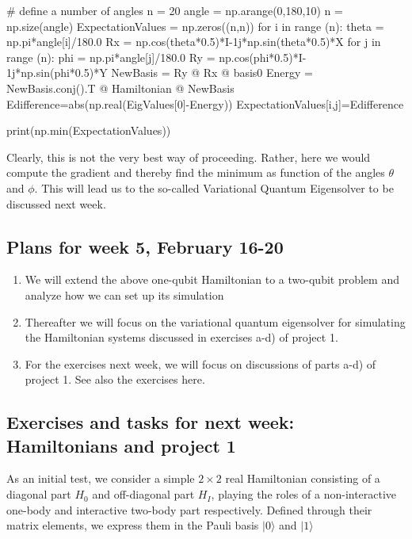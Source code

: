 \documentclass[%
oneside,                 %
final,                   %
10pt]{article}
\begin{document}
\bpycod
# define a number of angles
n = 20
angle = np.arange(0,180,10)
n = np.size(angle)
ExpectationValues = np.zeros((n,n))
for i in range (n):
    theta = np.pi*angle[i]/180.0
    Rx = np.cos(theta*0.5)*I-1j*np.sin(theta*0.5)*X
    for j in range (n):
        phi = np.pi*angle[j]/180.0
        Ry = np.cos(phi*0.5)*I-1j*np.sin(phi*0.5)*Y
        NewBasis = Ry @ Rx @ basis0
        Energy = NewBasis.conj().T @ Hamiltonian @ NewBasis
        Edifference=abs(np.real(EigValues[0]-Energy))
        ExpectationValues[i,j]=Edifference

print(np.min(ExpectationValues))

\epycod


Clearly, this is not the very best way of proceeding. Rather, here we
would compute the gradient and thereby find the minimum as function of
the angles $\theta$ and $\phi$.  This will lead us to the so-called Variational Quantum Eigensolver to be discussed next week.

\subsection{Plans for week 5, February 16-20}

\begin{enumerate}
\item We will extend the above one-qubit Hamiltonian to a two-qubit problem and analyze how we can set up its simulation

\item Thereafter we will focus on the variational quantum eigensolver for simulating the Hamiltonian systems discussed in exercises a-d) of project 1.

\item For the exercises next week, we will focus on discussions of parts a-d) of project 1. See also the exercises here.
\end{enumerate}

\noindent
\subsection{Exercises and tasks for next week: Hamiltonians and project 1}

As an initial test, we consider a simple $2\times 2$ real
Hamiltonian consisting of a diagonal part $H_0$ and off-diagonal part
$H_I$, playing the roles of a non-interactive one-body and interactive
two-body part respectively. Defined through their matrix elements, we
express them in the Pauli basis $\vert 0\rangle$ and $\vert 1 \rangle$
\end{document}
